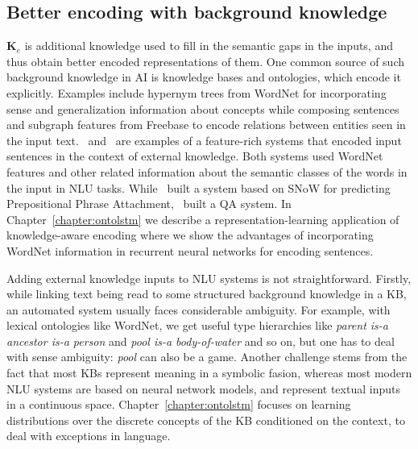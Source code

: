 \subsection{Better encoding with background knowledge} $\mathbf{K}_e$ is additional knowledge used
to fill in the semantic gaps in the inputs, and thus obtain better encoded representations of them.
One common source of such background knowledge in AI is knowledge bases and ontologies, which encode it
explicitly. Examples include hypernym trees from WordNet for incorporating sense and generalization
information about concepts while composing sentences and subgraph features from Freebase to encode
relations between entities seen in the input text.~\cite{moldovan2001logic}
and~\cite{krymolowski1998incorporating} are examples of a feature-rich systems that encoded input
sentences in the context of external knowledge. Both systems used WordNet features and other related
information about the semantic classes of the words in the input in NLU tasks.
While~\cite{krymolowski1998incorporating} built a system based on SNoW \citep{CCRR99} for predicting
Prepositional Phrase Attachment,~\cite{moldovan2001logic} built a QA system. In
Chapter~\ref{chapter:ontolstm} we describe a representation-learning application of knowledge-aware
encoding where we show the advantages of incorporating WordNet information in recurrent neural
networks for encoding sentences.

Adding external knowledge inputs to NLU systems is not straightforward. Firstly, while linking text
being read to some structured background knowledge in a KB, an automated system usually faces
considerable ambiguity. For example, with lexical ontologies like WordNet, we get useful type
hierarchies like \textit{parent is-a ancestor is-a person} and \textit{pool is-a body-of-water} and
so on, but one has to deal with sense ambiguity: \textit{pool} can also be a game. Another challenge
stems from the fact that most KBs represent meaning in a symbolic fasion, whereas most modern NLU
systems are based on neural network models, and represent textual inputs in a continuous space.
Chapter~\ref{chapter:ontolstm} focuses on learning distributions over the discrete concepts of the
KB conditioned on the context, to deal with exceptions in language.

